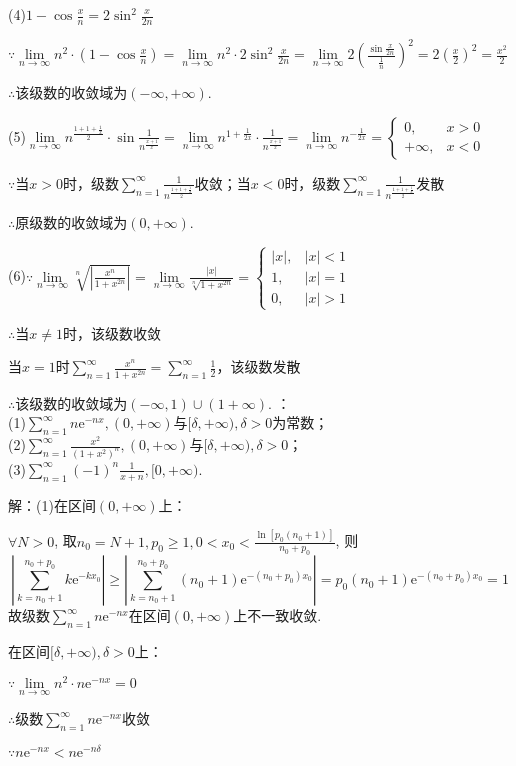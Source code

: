 \documentclass[12pt,UTF8]{ctexart}
\newcommand\Lim[0]{\lim\limits_{n\rightarrow\infty}}
\newcommand\Ser[1]{\sum_{n=#1}^\infty}
\newcommand{\me}[0]{\mathrm e}
\begin{document}
\begin{enumerate}
(4)$1-\cos\frac xn=2\sin^2\frac x{2n}$

$\because\Lim n^2\cdot(1-\cos\frac xn)=\Lim n^2\cdot2\sin^2\frac x{2n}=\Lim2(\frac{\sin\frac x{2n}}{\frac1n})^2=2(\frac x2)^2=\frac{x^2}2$

$\therefore$该级数的收敛域为$(-\infty,+\infty)$.

(5)$\Lim n^{\frac{1+1+\frac1x}2}\cdot\sin\frac1{n^{\frac{x+1}x}}=\Lim n^{1+\frac1{2x}}\cdot\frac1{n^{\frac{x+1}x}}=\Lim n^{-\frac1{2x}}=\begin{cases}
0,&x>0\\
+\infty,&x<0
\end{cases}$

$\because$当$x>0$时，级数$\Ser1\frac1{n^{\frac{1+1+\frac1x}2}}$收敛；当$x<0$时，级数$\Ser1\frac1{n^{\frac{1+1+\frac1x}2}}$发散

$\therefore$原级数的收敛域为$(0,+\infty)$.

(6)$\because\Lim\sqrt[n]{|\frac{x^n}{1+x^{2n}}|}=\Lim\frac{|x|}{\sqrt[n]{1+x^{2n}}}=\begin{cases}
|x|,&|x|<1\\
1,&|x|=1\\
0,&|x|>1
\end{cases}$

$\therefore$当$x\neq1$时，该级数收敛

当$x=1$时$\Ser{1}\frac{x^n}{1+x^{2n}}=\Ser1\frac12$，该级数发散

$\therefore$该级数的收敛域为$(-\infty,1)\cup(1+\infty)$.
：
\\
(1)$\Ser{1}n\mathrm e^{-nx},(0,+\infty)$与$[\delta,+\infty),\delta>0$为常数；\\
(2)$\Ser{1}\frac{x^2}{(1+x^2)^n},(0,+\infty)$与$[\delta,+\infty),\delta>0$；\\
(3)$\Ser{1}(-1)^n\frac1{x+n},[0,+\infty)$.

解：(1)在区间$(0,+\infty)$上：

$\forall N>0$, 取$n_0=N+1,p_0\geq1,0<x_0<\frac{\ln[p_0(n_0+1)]}{n_0+p_0}$, 则
\[
|\sum_{k=n_0+1}^{n_0+p_0}k\me^{-kx_0}|\geq|\sum_{k=n_0+1}^{n_0+p_0}(n_0+1)\me^{-(n_0+p_0)x_0}|=p_0(n_0+1)\me^{-(n_0+p_0)x_0}=1
\]
故级数$\Ser{1}n\mathrm e^{-nx}$在区间$(0,+\infty)$上不一致收敛.

在区间$[\delta,+\infty),\delta>0$上：

$\because\Lim n^2\cdot n\me^{-nx}=0$

$\therefore$级数$\Ser{1}n\mathrm e^{-nx}$收敛

$\because n\me^{-nx}<n\me^{-n\delta}$


\end{enumerate}
\end{document}
